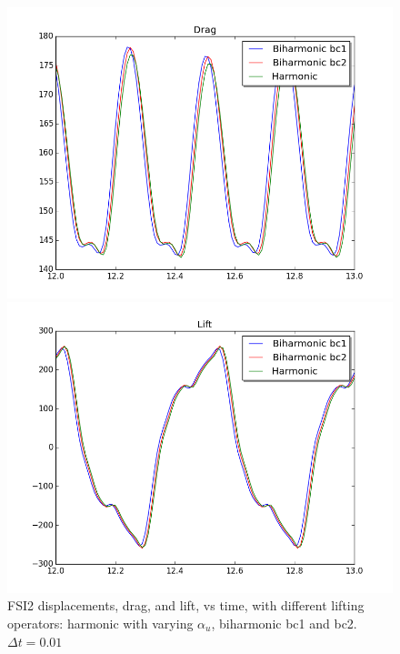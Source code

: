 \begin{figure}[H]
\begin{minipage}[b]{0.6\linewidth}
    \includegraphics[scale=0.40]{./Mesh_motion_results/FSI2_dt001_drag.png} 
    \vspace{4ex}
  \end{minipage}%
  \begin{minipage}[b]{0.6\linewidth}
    \centering
    \includegraphics[scale=0.40]{./Mesh_motion_results/FSI2_dt001_lift.png} 
    \vspace{4ex}
  \end{minipage} 
\caption {FSI2 displacements, drag, and lift, vs time, with different lifting operators: harmonic with varying $\alpha_u$, biharmonic bc1 and bc2. $\Delta t = 0.01$}
\label{fig:FSI2_motion-1} 
\end{figure}

